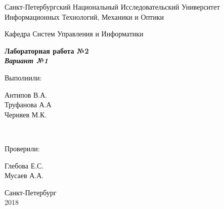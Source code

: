 \begin{titlepage}
  \begin{center}
    \vspace{2cm}
    Санкт-Петербургский Национальный Исследовательский Университет\\
    Информационных Технологий, Механики и Оптики

    \vspace{6cm}

    Кафедра Систем Управления и Информатики

    \vspace{3cm}
    \textbf{Лабораторная работа №2 \\ \textit{Вариант №1}}
  \end{center}
  \vspace{4cm}
  \hfill
  \parbox[top][3cm][t]{3cm}{Выполнили:}
  \parbox[top][3cm][t]{3cm}{
  Антипов В.А.\\
  Труфанова А.А\\
  Черняев М.К.}
  \\

  \hfill
  \parbox[right][3cm][t]{3cm}{Проверили:}
  \parbox[right][3cm][t]{3cm}{
  Глебова Е.С.\\
  Мусаев А.А.}

  \vfill
  \begin{center}
  Санкт-Петербург \\ 2018
  \end{center}
\end{titlepage}